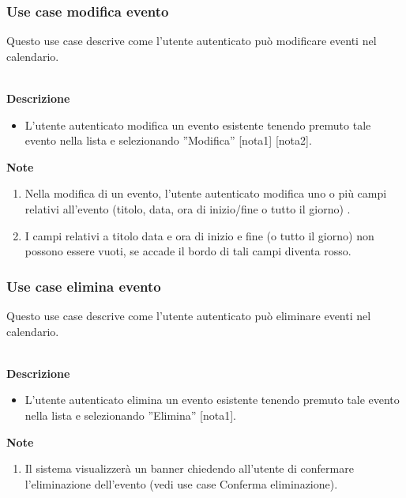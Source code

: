 \documentclass[a4paper,12pt]{article}
\begin{document}
\subsubsection*{Use case modifica evento}

Questo use case descrive come l'utente autenticato può modificare eventi nel calendario.


\textbf{\\Descrizione}
\begin{itemize} \setlength\itemsep{0.01em}
\item L'utente autenticato modifica un evento esistente tenendo premuto tale evento nella lista e selezionando ''Modifica''  [nota1] [nota2].
\end{itemize}

\textbf{Note}
\begin{enumerate} \setlength\itemsep{0.01em}
\item Nella modifica di un evento, l'utente autenticato modifica uno o più campi relativi all'evento (titolo, data, ora di inizio/fine o tutto il giorno) .
\item I campi relativi a titolo data e ora di inizio e fine (o tutto il giorno) non possono essere vuoti, se accade il bordo di tali campi diventa rosso.
\end{enumerate}




\subsubsection*{Use case elimina evento}

Questo use case descrive come l'utente autenticato può eliminare eventi nel calendario.


\textbf{\\Descrizione}
\begin{itemize} \setlength\itemsep{0.01em}
\item L'utente autenticato elimina un evento esistente tenendo premuto tale evento nella lista e selezionando ''Elimina''  [nota1].
\end{itemize}

\textbf{Note}
\begin{enumerate} \setlength\itemsep{0.01em}
\item Il sistema visualizzerà un banner chiedendo all'utente di confermare l'eliminazione dell'evento  (vedi use case Conferma eliminazione).
\end{enumerate}
\end{document}
